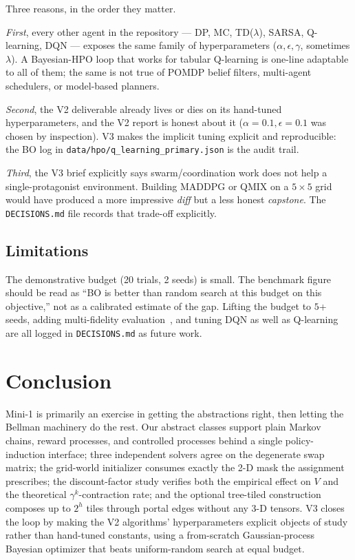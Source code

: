 \documentclass[11pt]{article}
\begin{document}
Three reasons, in the order they matter.

\emph{First}, every other agent in the repository --- DP, MC, TD($\lambda$),
SARSA, Q-learning, DQN --- exposes the same family of hyperparameters
($\alpha, \epsilon, \gamma$, sometimes $\lambda$). A Bayesian-HPO loop
that works for tabular Q-learning is one-line adaptable to all of
them; the same is not true of POMDP belief filters, multi-agent
schedulers, or model-based planners.

\emph{Second}, the V2 deliverable already lives or dies on its
hand-tuned hyperparameters, and the V2 report is honest about it
($\alpha = 0.1, \epsilon = 0.1$ was chosen by inspection). V3
makes the implicit tuning explicit and reproducible: the BO log in
\texttt{data/hpo/q\_learning\_primary.json} is the audit trail.

\emph{Third}, the V3 brief explicitly says swarm/coordination work
does not help a single-protagonist environment. Building MADDPG or
QMIX on a $5 \times 5$ grid would have produced a more impressive
\emph{diff} but a less honest \emph{capstone}. The
\texttt{DECISIONS.md} file records that trade-off explicitly.

\subsection{Limitations}

The demonstrative budget (20 trials, 2 seeds) is small. The
benchmark figure should be read as ``BO is better than random search
at this budget on this objective,'' not as a calibrated estimate of
the gap. Lifting the budget to $5$+ seeds, adding multi-fidelity
evaluation~\citep{klein2017}, and tuning DQN as well as Q-learning are
all logged in \texttt{DECISIONS.md} as future work.

\section{Conclusion}

Mini-1 is primarily an exercise in getting the abstractions right,
then letting the Bellman machinery do the rest. Our abstract classes
support plain Markov chains, reward processes, and controlled
processes behind a single policy-induction interface; three
independent solvers agree on the degenerate swap matrix; the
grid-world initializer consumes exactly the 2-D mask the assignment
prescribes; the discount-factor study verifies both the empirical
effect on $V$ and the theoretical $\gamma^k$-contraction rate; and the
optional tree-tiled construction composes up to $2^{h}$ tiles through
portal edges without any 3-D tensors. V3 closes the loop by
making the V2 algorithms' hyperparameters explicit objects of study
rather than hand-tuned constants, using a from-scratch Gaussian-process
Bayesian optimizer that beats uniform-random search at equal budget.
\end{document}
